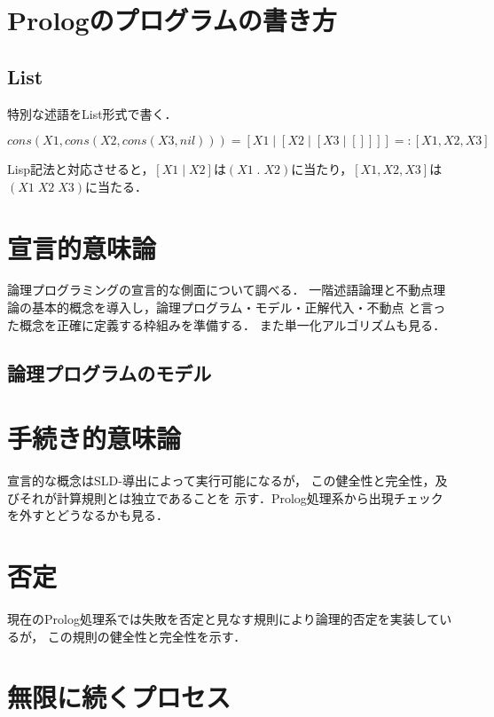 \documentclass[uplatex, 12pt, dvipdfmx]{jsreport}
\begin{document}
\section{Prologのプログラムの書き方}

\subsection{List}
特別な述語をList形式で書く．
\begin{definition}[list記法]
    \[cons(X1,cons(X2,cons(X3,nil))) = [X1\mid[X2\mid[X3\mid[]]]] =: [X1,X2,X3]\]
\end{definition}
\begin{remark}
    Lisp記法と対応させると，$[X1\mid X2]$は$(X1\;.\;X2)$に当たり，$[X1,X2,X3]$は$(X1\;X2\;X3)$に当たる．
\end{remark}

\section{宣言的意味論}

論理プログラミングの宣言的な側面について調べる．
一階述語論理と不動点理論の基本的概念を導入し，論理プログラム・モデル・正解代入・不動点
と言った概念を正確に定義する枠組みを準備する．
また単一化アルゴリズムも見る．

\subsection{論理プログラムのモデル}

\section{手続き的意味論}

宣言的な概念はSLD-導出によって実行可能になるが，
この健全性と完全性，及びそれが計算規則とは独立であることを
示す．Prolog処理系から出現チェックを外すとどうなるかも見る．

\section{否定}

現在のProlog処理系では失敗を否定と見なす規則により論理的否定を実装しているが，
この規則の健全性と完全性を示す．

\section{無限に続くプロセス}
\end{document}
